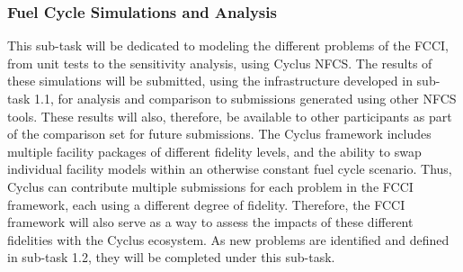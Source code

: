 \subsubsection{Fuel Cycle Simulations and Analysis} 

This sub-task will be dedicated to modeling the different problems of the
\gls{FCCI}, from unit tests to the sensitivity analysis, using Cyclus
\gls{NFCS}\cite{CYCLUS}. The results of these simulations will be submitted,
using the infrastructure developed in sub-task 1.1, for analysis and comparison
to submissions generated using other \gls{NFCS} tools. These results will
also, therefore, be available to other participants as part of the comparison
set for future submissions. The Cyclus framework includes multiple facility
packages of different fidelity levels, and the ability to swap individual
facility models within an otherwise constant fuel cycle scenario. Thus, Cyclus
can contribute multiple submissions for each problem in the \gls{FCCI}
framework, each using a different degree of fidelity. Therefore, the
\gls{FCCI} framework will also serve as a way to assess the impacts of these
different fidelities with the Cyclus ecosystem. As new problems are identified
and defined in sub-task 1.2, they will be completed under this sub-task.


